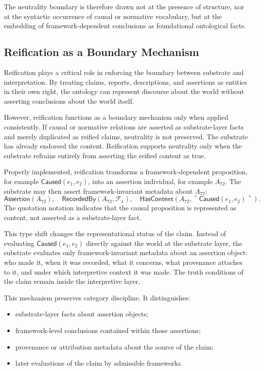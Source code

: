 The neutrality boundary is therefore drawn not at the presence
of structure,
nor at the syntactic occurrence of causal or normative vocabulary,
but at the embedding of framework-dependent conclusions
as foundational ontological facts.

\subsection{Reification as a Boundary Mechanism}
\label{sec:reification}

Reification plays a critical role in
enforcing the boundary between substrate and interpretation.
By treating claims, reports, descriptions, and assertions
as entities in their own right,
the ontology can represent discourse about the world
without asserting conclusions about the world itself.

However, reification functions as a boundary mechanism
only when applied consistently.
If causal or normative relations are asserted as
substrate-layer facts and merely duplicated as reified claims,
neutrality is not preserved.
The substrate has already endorsed the content.
Reification supports neutrality only when
the substrate refrains entirely from asserting the reified content as true.

Properly implemented, reification transforms
a framework-dependent proposition,
for example $\mathsf{Caused}(e_1,e_2)$,
into an assertion individual,
for example $A_{72}$.
The substrate may then assert framework-invariant metadata
about $A_{72}$:
\[
\mathsf{Assertion}(A_{72}), \quad
  \mathsf{RecordedBy}(A_{72}, \mathcal{F}_1), \quad
  \mathsf{HasContent}(A_{72}, \ulcorner \mathsf{Caused}(e_1,e_2) \urcorner).
\]
The quotation notation indicates that the causal proposition
is represented as content,
not asserted as a substrate-layer fact.

This type shift changes the representational status of the claim.
Instead of evaluating
$\mathsf{Caused}(e_1,e_2)$
directly against the world at the substrate layer,
the substrate evaluates only framework-invariant metadata
about an assertion object:
who made it, when it was recorded,
what it concerns,
what provenance attaches to it,
and under which interpretive context it was made.
The truth conditions of the claim remain inside the interpretive layer.

This mechanism preserves category discipline.
It distinguishes:
\begin{itemize}
  \item substrate-layer facts about assertion objects;
  \item framework-level conclusions contained within those assertions;
  \item provenance or attribution metadata about the source of the claim;
  \item later evaluations of the claim by admissible frameworks.
\end{itemize}

